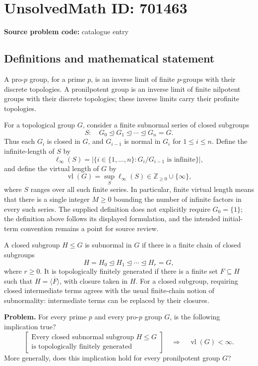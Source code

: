 \documentclass[11pt]{article}
\newcommand{\Z}{\mathbb{Z}}
\begin{document}
\section*{UnsolvedMath ID: 701463}
\textbf{Source problem code:} catalogue entry
\subsection{Definitions and mathematical statement}
A pro-$p$ group, for a prime $p$, is an inverse limit of finite $p$-groups with their discrete topologies. A pronilpotent group is an inverse limit of finite nilpotent groups with their discrete topologies; these inverse limits carry their profinite topologies.

For a topological group $G$, consider a finite subnormal series of closed subgroups
\[
S:\quad G_0\trianglelefteq G_1\trianglelefteq\cdots\trianglelefteq G_n=G.
\]
Thus each $G_i$ is closed in $G$, and $G_{i-1}$ is normal in $G_i$ for $1\leq i\leq n$. Define the infinite-length of $S$ by
\[
\ell_\infty(S)=\bigl|\{i\in\{1,\ldots,n\}:G_i/G_{i-1}\text{ is infinite}\}\bigr|,
\]
and define the virtual length of $G$ by
\[
\operatorname{vl}(G)=\sup_S\ell_\infty(S)\in\Z_{\geq0}\cup\{\infty\},
\]
where $S$ ranges over all such finite series. In particular, finite virtual length means that there is a single integer $M\geq0$ bounding the number of infinite factors in every such series. The supplied definition does not explicitly require $G_0=\{1\}$; the definition above follows its displayed formulation, and the intended initial-term convention remains a point for source review.

A closed subgroup $H\leq G$ is subnormal in $G$ if there is a finite chain of closed subgroups
\[
H=H_0\trianglelefteq H_1\trianglelefteq\cdots\trianglelefteq H_r=G,
\]
where $r\geq0$. It is topologically finitely generated if there is a finite set $F\subseteq H$ such that $H=\overline{\langle F\rangle}$, with closure taken in $H$. For a closed subgroup, requiring closed intermediate terms agrees with the usual finite-chain notion of subnormality: intermediate terms can be replaced by their closures.

\textbf{Problem.} For every prime $p$ and every pro-$p$ group $G$, is the following implication true?
\[
\left[
\begin{gathered}
\text{Every closed subnormal subgroup }H\leq G\\
\text{is topologically finitely generated}
\end{gathered}
\right]
\quad\Longrightarrow\quad
\operatorname{vl}(G)<\infty.
\]
More generally, does this implication hold for every pronilpotent group $G$?
\end{document}
